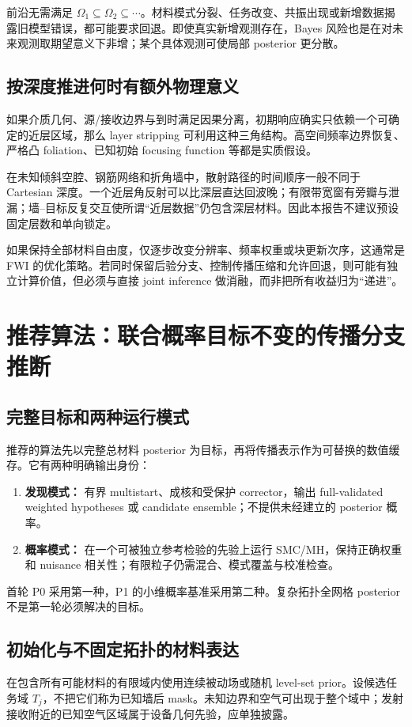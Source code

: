 前沿无需满足 $\Omega_1\subseteq\Omega_2\subseteq\cdots$。材料模式分裂、任务改变、共振出现或新增数据揭露旧模型错误，都可能要求回退。即使真实新增观测存在，Bayes 风险也是在对未来观测取期望意义下非增；某个具体观测可使局部 posterior 更分散。

\subsection{按深度推进何时有额外物理意义}
如果介质几何、源/接收边界与到时满足因果分离，初期响应确实只依赖一个可确定的近层区域，那么 layer stripping 可利用这种三角结构。高空间频率边界恢复、严格凸 foliation、已知初始 focusing function 等都是实质假设。\cite{L_Somersalo,L_Zhai,L_Marchenko22}

在未知倾斜空腔、钢筋网络和折角墙中，散射路径的时间顺序一般不同于 Cartesian 深度。一个近层角反射可以比深层直达回波晚；有限带宽窗有旁瓣与泄漏；墙--目标反复交互使所谓“近层数据”仍包含深层材料。因此本报告不建议预设固定层数和单向锁定。

如果保持全部材料自由度，仅逐步改变分辨率、频率权重或块更新次序，这通常是 FWI 的优化策略。若同时保留后验分支、控制传播压缩和允许回退，则可能有独立计算价值，但必须与直接 joint inference 做消融，而非把所有收益归为“递进”。

\section{推荐算法：联合概率目标不变的传播分支推断}
\subsection{完整目标和两种运行模式}
推荐的算法先以完整总材料 posterior 为目标，再将传播表示作为可替换的数值缓存。它有两种明确输出身份：
\begin{enumerate}
\item \textbf{发现模式：} 有界 multistart、成核和受保护 corrector，输出 full-validated weighted hypotheses 或 candidate ensemble；不提供未经建立的 posterior 概率。
\item \textbf{概率模式：} 在一个可被独立参考检验的先验上运行 SMC/MH，保持正确权重和 nuisance 相关性；有限粒子仍需混合、模式覆盖与校准检查。
\end{enumerate}
首轮 P0 采用第一种，P1 的小维概率基准采用第二种。复杂拓扑全网格 posterior 不是第一轮必须解决的目标。

\subsection{初始化与不固定拓扑的材料表达}
在包含所有可能材料的有限域内使用连续被动场或随机 level-set prior。设候选任务域 $T_j$，不把它们称为已知墙后 mask。未知边界和空气可出现于整个域中；发射接收附近的已知空气区域属于设备几何先验，应单独披露。

